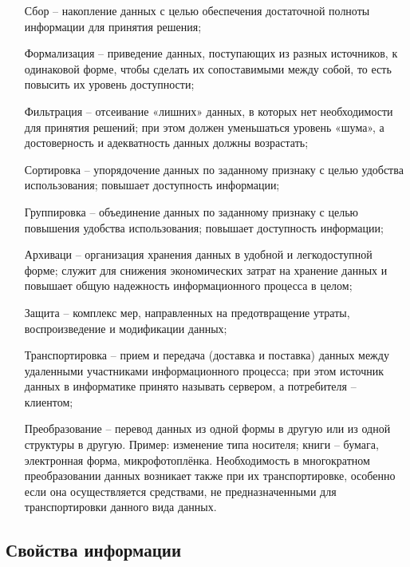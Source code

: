 \documentclass[a4paper]{article}
\begin{document}
\begin{enumerate}
\item[Сбор] – накопление данных с целью обеспечения достаточной полноты информации для принятия решения;

\item[Формализация] – приведение данных, поступающих из разных источников, к одинаковой форме, чтобы сделать их сопоставимыми между собой, то есть повысить их уровень доступности;

\item[Фильтрация] – отсеивание «лишних» данных, в которых нет необходимости для принятия решений; при этом должен уменьшаться уровень «шума», а достоверность и адекватность данных должны возрастать;

\item[Сортировка] – упорядочение данных по заданному признаку с целью удобства использования; повышает доступность информации;

\item[Группировка] – объединение данных по заданному признаку с целью повышения удобства использования; повышает доступность информации;

\item[Архиваци] – организация хранения данных в удобной и легкодоступной форме; служит для снижения экономических затрат на хранение данных и повышает общую надежность информационного процесса в целом;

\item[Защита] – комплекс мер, направленных на предотвращение утраты, воспроизведение и модификации данных;

\item[Транспортировка] – прием и передача (доставка и поставка) данных между удаленными участниками информационного процесса; при этом источник данных в информатике принято называть сервером, а потребителя – клиентом;

\item[Преобразование] – перевод данных из одной формы в другую или из одной структуры в другую. Пример: изменение типа носителя; книги – бумага, электронная форма, микрофотоплёнка. Необходимость в многократном преобразовании данных возникает также при их транспортировке, особенно если она осуществляется средствами, не предназначенными для транспортировки данного вида данных.

\end{enumerate}

\subsection{Свойства информации}
\end{document}
